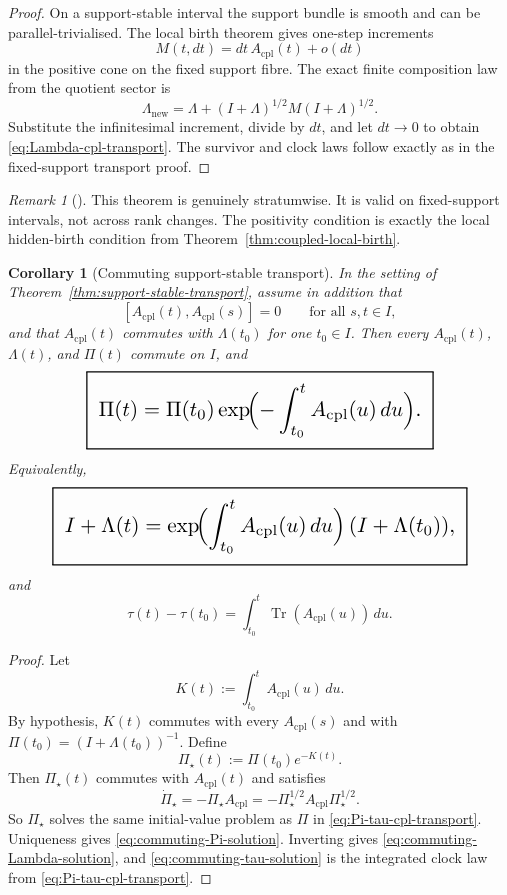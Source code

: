 \documentclass[11pt,a4paper]{article}
\numberwithin{equation}{section}
\DeclareMathOperator{\Tr}{Tr}
\newcommand{\geomboxed}[1]{%
  \setlength{\fboxsep}{8pt}%
  \setlength{\fboxrule}{0.9pt}%
  \fbox{\scalebox{1.5}{$\displaystyle #1$}}%
}
\theoremstyle{thmcompact}
\newtheorem{corollary}[theorem]{Corollary}
\theoremstyle{remark}
\newtheorem*{remarkplain}{Remark}
\newenvironment{remark}[1][]%
{\begin{remarkbox}\begin{remarkplain}[#1]\normalfont}
{\end{remarkplain}\end{remarkbox}}
\begin{document}
\begin{proof}
On a support-stable interval the support bundle is smooth and can be parallel-trivialised. The local birth theorem gives one-step increments
\[
M(t,dt)=dt\,A_{\mathrm{cpl}}(t)+o(dt)
\]
in the positive cone on the fixed support fibre. The exact finite composition law from the quotient sector is
\[
\Lambda_{\mathrm{new}}=\Lambda+(I+\Lambda)^{1/2}M(I+\Lambda)^{1/2}.
\]
Substitute the infinitesimal increment, divide by $dt$, and let $dt\to0$ to obtain \eqref{eq:Lambda-cpl-transport}. The survivor and clock laws follow exactly as in the fixed-support transport proof.
\end{proof}

\begin{remark}
This theorem is genuinely stratumwise. It is valid on fixed-support intervals, not across rank changes. The positivity condition is exactly the local hidden-birth condition from Theorem~\ref{thm:coupled-local-birth}.
\end{remark}

\begin{corollary}[Commuting support-stable transport]
\label{cor:commuting-support-transport}
In the setting of Theorem~\ref{thm:support-stable-transport}, assume in addition that
\[
[A_{\mathrm{cpl}}(t),A_{\mathrm{cpl}}(s)]=0
\qquad\text{for all }s,t\in I,
\]
and that $A_{\mathrm{cpl}}(t)$ commutes with $\Lambda(t_0)$ for one $t_0\in I$. Then every $A_{\mathrm{cpl}}(t)$, $\Lambda(t)$, and $\Pi(t)$ commute on $I$, and
\begin{equation}
\geomboxed{
\Pi(t)
=
\Pi(t_0)\exp\!\Bigl(-\int_{t_0}^t A_{\mathrm{cpl}}(u)\,du\Bigr).
}
\label{eq:commuting-Pi-solution}
\end{equation}
Equivalently,
\begin{equation}
\geomboxed{
I+\Lambda(t)
=
\exp\!\Bigl(\int_{t_0}^t A_{\mathrm{cpl}}(u)\,du\Bigr)\,(I+\Lambda(t_0)),
}
\label{eq:commuting-Lambda-solution}
\end{equation}
and
\begin{equation}
\tau(t)-\tau(t_0)=\int_{t_0}^t \Tr(A_{\mathrm{cpl}}(u))\,du.
\label{eq:commuting-tau-solution}
\end{equation}
\end{corollary}

\begin{proof}
Let
\[
K(t):=\int_{t_0}^t A_{\mathrm{cpl}}(u)\,du.
\]
By hypothesis, $K(t)$ commutes with every $A_{\mathrm{cpl}}(s)$ and with $\Pi(t_0)=(I+\Lambda(t_0))^{-1}$. Define
\[
\Pi_\star(t):=\Pi(t_0)e^{-K(t)}.
\]
Then $\Pi_\star(t)$ commutes with $A_{\mathrm{cpl}}(t)$ and satisfies
\[
\dot\Pi_\star
=
-\Pi_\star A_{\mathrm{cpl}}
=
-\Pi_\star^{1/2}A_{\mathrm{cpl}}\Pi_\star^{1/2}.
\]
So $\Pi_\star$ solves the same initial-value problem as $\Pi$ in \eqref{eq:Pi-tau-cpl-transport}. Uniqueness gives \eqref{eq:commuting-Pi-solution}. Inverting gives \eqref{eq:commuting-Lambda-solution}, and \eqref{eq:commuting-tau-solution} is the integrated clock law from \eqref{eq:Pi-tau-cpl-transport}.
\end{proof}
\end{document}
